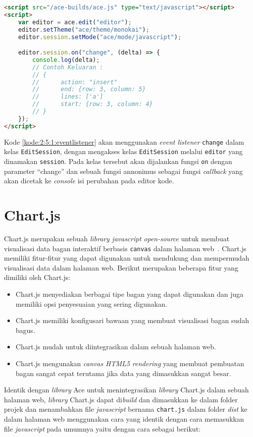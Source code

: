 \begin{lstlisting}[language={html}, caption={Contoh kode event listener}, label={kode:2:5:1:eventlistener}]
<script src="/ace-builds/ace.js" type="text/javascript"></script>
<script>
	var editor = ace.edit("editor");
	editor.setTheme("ace/theme/monokai");
	editor.session.setMode("ace/mode/javascript");

	editor.session.on("change", (delta) => {
        console.log(delta);
		// Contoh Keluaran :
		// {
		// 		action: "insert"
		// 		end: {row: 3, column: 5}
		// 		lines: ['a']
		// 		start: {row: 3, column: 4}
		// }
	});
</script>
\end{lstlisting}

Kode \ref{kode:2:5:1:eventlistener} akan menggunakan \textit{event listener} \verb|change| dalam kelas \verb|EditSession|, dengan mengakses kelas \verb|EditSession| melalui \verb|editor| yang dinamakan \verb|session|. Pada kelas tersebut akan dijalankan fungsi \verb|on| dengan parameter ``change'' dan sebuah fungsi annonimus sebagai fungsi \textit{callback} yang akan dicetak ke \textit{console} isi perubahan pada editor kode.

\section{Chart.js}

Chart.js merupakan sebuah \textit{library javascript open-source} untuk membuat visualisasi data bagan interaktif berbasis \verb|canvas| dalam halaman web~\cite{chartjs}. Chart.js memiliki fitur-fitur yang dapat digunakan untuk mendukung dan mempermudah visualisasi data dalam halaman web. Berikut merupakan beberapa fitur yang dimiliki oleh Chart.js:

\begin{itemize}
	\item Chart.js menyediakan berbagai tipe bagan yang dapat digunakan dan juga memiliki opsi penyesuaian yang sering digunakan.
	\item Chart.js memiliki konfigusari bawaan yang membuat visualisasi bagan sudah bagus.
	\item Chart.js mudah untuk diintegrasikan dalam sebuah halaman web.
	\item Chart.js mengunakan \textit{canvas HTML5 rendering} yang membuat pembuatan bagan sangat cepat terutama jika data yang dimasukkan sangat besar.
\end{itemize}
 
Identik dengan \textit{library} Ace untuk menintegrasikan \textit{library} Chart.js dalam sebuah halaman web, \textit{library} Chart.js dapat di\textit{build} dan dimasukkan ke dalam folder projek dan menambahkan file \textit{javascript} bernama \verb|chart.js| dalam folder \textit{dist} ke dalam halaman web menggunakan cara yang identik dengan cara memasukkan file \textit{javascript} pada umumnya yaitu dengan cara sebagai berikut:

